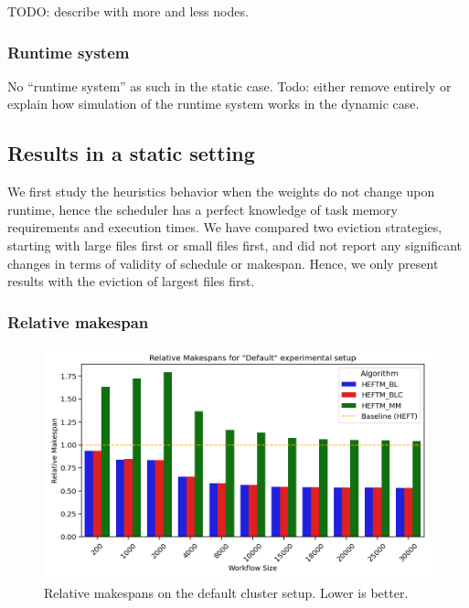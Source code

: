 \documentclass[conference]{IEEEtran}
\newcommand{\skug}[1]{{\color{blue}[SK: #1]}}
\begin{document}
    TODO: describe with more and less nodes.


    \subsubsection{Runtime system}

    No ``runtime system'' as such in the static case.
    Todo: either remove entirely or explain how simulation of the runtime system works in the dynamic case.





\subsection{Results in a static setting} %
\label{sec.expe.static}

    We first study the heuristics behavior when the weights do not change upon runtime,
    hence the scheduler has a perfect knowledge of task memory requirements and execution times.
    We have compared two eviction strategies, starting with large files first or small files first,
    and did not report any significant changes in terms of validity of schedule or makespan.
    Hence, we only present results with the eviction of largest files first.

    \subsubsection{Relative makespan}

    \begin{figure}[tb]
        \centering
        \includegraphics[width=0.9\columnwidth] {images/disk-model/rel-ms-normal-bar}
        \caption{Relative makespans on the default cluster setup. Lower is better.}
        \label{fig:rel-ms-normal-bare}
        \vspace{-0.3cm}
    \end{figure}
\end{document}
